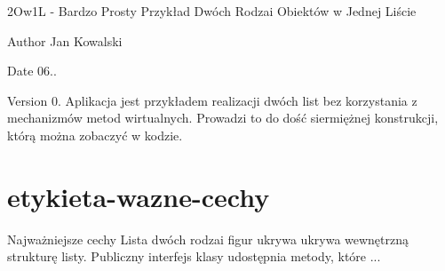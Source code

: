 2\+Ow1\+L -\/ Bardzo Prosty Przykład Dwóch Rodzai Obiektów w Jednej Liście \begin{DoxyAuthor}{Author}
Jan Kowalski 
\end{DoxyAuthor}
\begin{DoxyDate}{Date}
06.. 
\end{DoxyDate}
\begin{DoxyVersion}{Version}
0. Aplikacja jest przykładem realizacji dwóch list bez korzystania z mechanizmów metod wirtualnych. Prowadzi to do dość siermiężnej konstrukcji, którą można zobaczyć w kodzie. 
\end{DoxyVersion}
\hypertarget{_my_etykieta-wazne-cechy}{}\section{etykieta-\/wazne-\/cechy}\label{_my_etykieta-wazne-cechy}
Najważniejsze cechy Lista dwóch rodzai figur ukrywa ukrywa wewnętrzną strukturę listy. Publiczny interfejs klasy udostępnia metody, które ... 